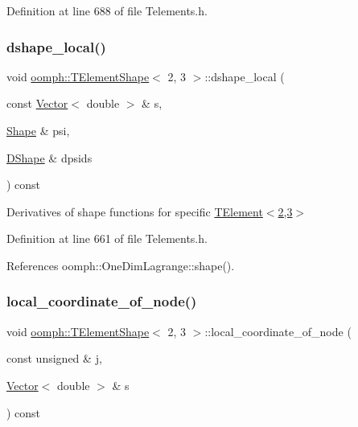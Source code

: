 Definition at line 688 of file Telements.\+h.

\mbox{\label{classoomph_1_1TElementShape_3_012_00_013_01_4_ab4f9dead4907b15a0acaed5c7a920e0a}} 
\subsubsection{\texorpdfstring{dshape\+\_\+local()}{dshape\_local()}}
{\footnotesize\ttfamily void \hyperlink{classoomph_1_1TElementShape}{oomph\+::\+T\+Element\+Shape}$<$ 2, 3 $>$\+::dshape\+\_\+local (\begin{DoxyParamCaption}\item[{const \hyperlink{classoomph_1_1Vector}{Vector}$<$ double $>$ \&}]{s,  }\item[{\hyperlink{classoomph_1_1Shape}{Shape} \&}]{psi,  }\item[{\hyperlink{classoomph_1_1DShape}{D\+Shape} \&}]{dpsids }\end{DoxyParamCaption}) const\hspace{0.3cm}{\ttfamily [inline]}}



Derivatives of shape functions for specific \hyperlink{classoomph_1_1TElement}{T\+Element$<$2,3$>$} 



Definition at line 661 of file Telements.\+h.



References oomph\+::\+One\+Dim\+Lagrange\+::shape().

\mbox{\label{classoomph_1_1TElementShape_3_012_00_013_01_4_a8771d894c753dc0d0e2dbc6ff084d460}} 
\subsubsection{\texorpdfstring{local\+\_\+coordinate\+\_\+of\+\_\+node()}{local\_coordinate\_of\_node()}}
{\footnotesize\ttfamily void \hyperlink{classoomph_1_1TElementShape}{oomph\+::\+T\+Element\+Shape}$<$ 2, 3 $>$\+::local\+\_\+coordinate\+\_\+of\+\_\+node (\begin{DoxyParamCaption}\item[{const unsigned \&}]{j,  }\item[{\hyperlink{classoomph_1_1Vector}{Vector}$<$ double $>$ \&}]{s }\end{DoxyParamCaption}) const\hspace{0.3cm}{\ttfamily [inline]}}



